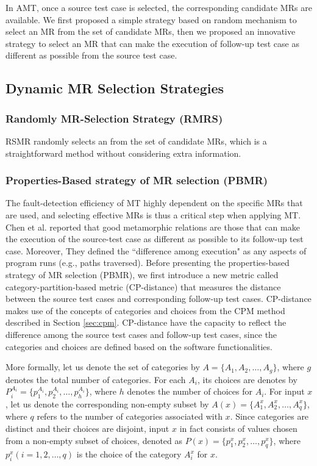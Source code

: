 \documentclass[10pt,journal,compsoc]{IEEEtran}
\begin{document}
In AMT, once a source test case is selected, the corresponding candidate MRs are available. We first proposed a simple strategy based on random mechanism to select an MR from the set of candidate MRs, then we proposed an innovative strategy to select an MR that can make the execution of follow-up test case as different as possible from the source test case.


\subsection{Dynamic MR Selection Strategies}
\label{sec:mrselection}

\subsubsection{Randomly MR-Selection Strategy (RMRS)}
\label{sec:rsmr}

RSMR randomly selects an from the set of candidate MRs, which is a straightforward method without considering extra information.

\subsubsection{Properties-Based strategy of MR selection (PBMR)}
\label{sec:pbmr}

The fault-detection efficiency of MT highly dependent on the specific MRs that are used, and selecting effective MRs is thus a critical step when applying MT. Chen et al. reported that good metamorphic relations are those that can make the execution of the source-test case as different as possible to its follow-up test case. Moreover, They defined the ``difference among execution" as any aspects of program runs (e.g., paths traversed).
Before presenting the properties-based strategy of MR selection (PBMR), we first introduce a new metric called category-partition-based metric (CP-distance) that measures the distance between the source test cases and corresponding follow-up test cases. CP-distance makes use of the concepts of categories and choices from the CPM method described in Section \ref{sec:cpm}. CP-distance have the capacity to reflect the difference among the source test cases and follow-up test cases, since the categories and choices are defined based on the software functionalities.

More formally, let us denote the set of categories by $A = \{A_1, A_2, \ldots, A_g\}$, where $g$ denotes the total number of categories. For each $A_i$, its choices are denotes by $P_i^{A_i} = \{p_1^{A_i},p_2^{A_i}, \ldots, p_h^{A_i}\}$, where $h$ denotes the number of choices for $A_i$. For input $x$, let us denote the corresponding non-empty subset by $A(x) = \{A_1^{x}, A_2^{x}, \ldots, A_q^{x}\}$, where $q$ refers to the number of categories associated with $x$. Since categories are distinct and their choices are disjoint, input $x$ in fact consists of values chosen from a non-empty subset of choices, denoted as $P(x) = \{p_1^{x}, p_2^{x}, \ldots, p_q^{x}\}$, where $p_i^x (i = 1, 2, \ldots, q)$ is the choice of the category $A_i^{x}$  for $x$.
\end{document}
